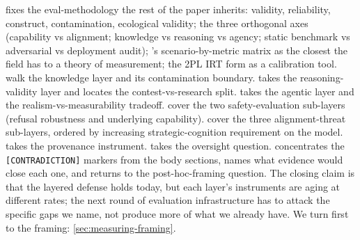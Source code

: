  fixes the eval-methodology 
the rest of the paper inherits: validity, reliability, construct,
contamination, ecological validity; the three orthogonal axes
(capability vs alignment; knowledge vs reasoning vs agency; static
benchmark vs adversarial  vs deployment audit); 's
scenario-by-metric matrix \citep{liang2022-helm} as the closest the
field has to a theory of measurement; the 2PL IRT form as a
calibration tool. 
walk the knowledge layer and its contamination boundary.
 takes the reasoning-validity layer
and locates the contest-vs-research split.
 takes the agentic layer and the
realism-vs-measurability tradeoff.
 cover
the two safety-evaluation sub-layers (refusal robustness and
underlying capability).
 cover the
three alignment-threat sub-layers, ordered by increasing
strategic-cognition requirement on the model.
 takes the provenance instrument.
 takes the oversight question.
 concentrates the
\texttt{[CONTRADICTION]} markers from the body sections, names
what evidence would close each one, and returns to the
post-hoc-framing question. The closing claim is that the layered
defense holds today, but each layer's instruments are aging at
different rates; the next round of evaluation infrastructure has
to attack the specific gaps we name, not produce more of what we
already have. We turn first to the framing:
\cref{sec:measuring-framing}.
